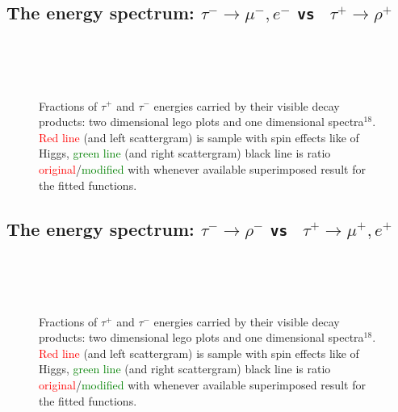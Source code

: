 \newpage
\subsection{The energy spectrum: $\tau^- \to \mu^-, e^-$ {\tt vs } $\tau^+ \to \rho^+$}
\vspace{1\baselineskip}

\begin{figure}[h!]
\centering
{}
 \\
 \\
 \\
\caption{\small Fractions of  $\tau^+$ and $\tau^-$ energies carried by their visible  decay products:
two dimensional lego plots and one dimensional spectra$^{18}$.
\textcolor{red}{Red line} (and left scattergram) is sample with spin effects like of Higgs,
\textcolor{green}{green line} (and right scattergram) \greenlineis
black line is ratio \textcolor{red}{original}/\textcolor{green}{modified} with whenever available superimposed result for the
fitted functions.
}
\end{figure}

\newpage
\subsection{The energy spectrum: $\tau^- \to \rho^-$ {\tt vs } $\tau^+ \to \mu^+, e^+$}
\vspace{1\baselineskip}

\begin{figure}[h!]
\centering
{}
 \\
 \\
 \\
\caption{\small Fractions of  $\tau^+$ and $\tau^-$ energies carried by their visible  decay products:
two dimensional lego plots and one dimensional spectra$^{18}$.
\textcolor{red}{Red line} (and left scattergram) is sample with spin effects like of Higgs,
\textcolor{green}{green line} (and right scattergram) \greenlineis
black line is ratio \textcolor{red}{original}/\textcolor{green}{modified} with whenever available superimposed result for the
fitted functions.
}
\end{figure}

